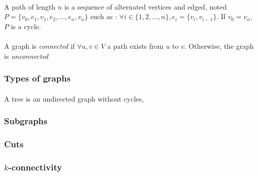 \paragraph{}
A path of length $n$ is a sequence of alternated vertices and edged, noted
$P = \{v_0, e_1, v_1, e_2, ..., e_n, v_n\}$ such as :
$\forall i \in \{1,2, ..., n\}, e_i = \{v_i, v_{i-1}\}$. If $v_0 = v_n$, $P$ is
a cycle.

\paragraph{}
A graph  is {\em connected} if $\forall u,v \in V$ a path exists from $u$
to $v$. Otherwise, the graph is {\em unconnected}

\subsubsection{Types of graphs}

\paragraph{}
A tree is an undirected graph without cycles,

\subsubsection{Subgraphs}

\subsubsection{Cuts}

\subsubsection{$k$-connectivity}
